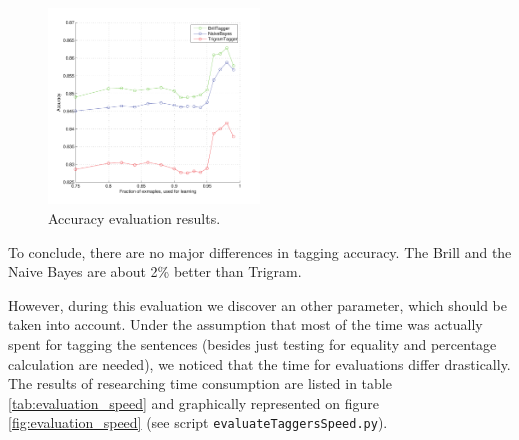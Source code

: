 \documentclass[10pt, conference, compsocconf]{IEEEtran}
\begin{document}
\begin{figure}[h]
\begin{center}
\includegraphics[width=0.5\textwidth]{../evaluation/graph.pdf} 
\end{center}
\caption{Accuracy evaluation results.}
\label{fig:evaluation}
\end{figure}
\par
To conclude, there are no major differences in tagging accuracy. The Brill and the Naive Bayes are about 2\% better than Trigram.
\par
However, during this evaluation we discover an other parameter, which should be taken into account.
Under the assumption that most of the time was actually spent for tagging the sentences (besides just testing for equality and percentage calculation are needed), we noticed that the time for evaluations differ drastically.
The results of researching time consumption are listed in table \ref{tab:evaluation_speed} and graphically represented on figure \ref{fig:evaluation_speed} (see script \texttt{evaluateTaggersSpeed.py}).
\end{document}
